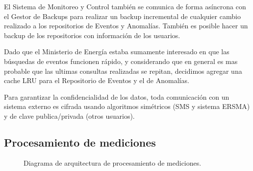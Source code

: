 \documentclass{article}
\theoremstyle{definition}
\theoremstyle{remark}
\begin{document}
El Sistema de Monitoreo y Control también se comunica de forma asíncrona con el Gestor de Backups para realizar un backup incremental de cualquier cambio realizado a los repositorios de Eventos y Anomalías. También es posible hacer un backup de los repositorios con información de los usuarios.

Dado que el Ministerio de Energía estaba sumamente interesado en que las búsquedas de eventos funcionen rápido, y considerando que en general es mas probable que las ultimas consultas realizadas se repitan, decidimos agregar una cache LRU para el Repositorio de Eventos y el de Anomalías.

Para garantizar la confidencialidad de los datos, toda comunicación con un sistema externo es cifrada usando algoritmos simétricos (SMS y sistema ERSMA) y de clave publica/privada (otros usuarios).

\subsection{Procesamiento de mediciones}  \label{procesador_mediciones}

\begin{figure}[H]
  \caption{Diagrama de arquitectura de procesamiento de mediciones.}
\end{figure}
\end{document}
